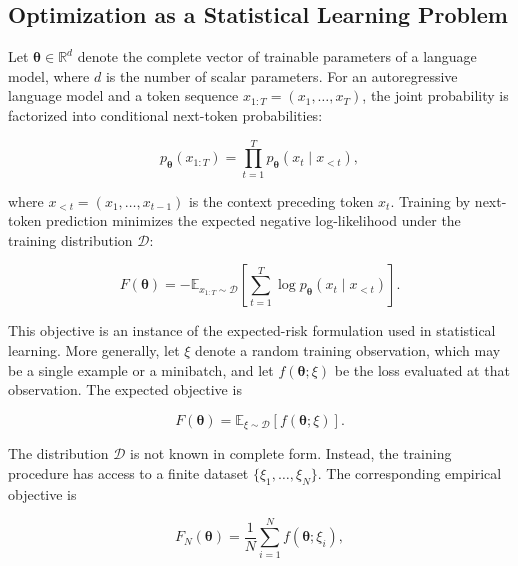 \subsection{Optimization as a Statistical Learning Problem}
\label{subsec:optimization-statistical-learning}

Let $\boldsymbol{\theta}\in\mathbb{R}^{d}$ denote the complete vector of
trainable parameters of a language model, where $d$ is the number of scalar
parameters. For an autoregressive language model and a token sequence
$x_{1:T}=(x_1,\ldots,x_T)$, the joint probability is factorized into
conditional next-token probabilities:

\begin{equation}
    p_{\boldsymbol{\theta}}(x_{1:T})
    =
    \prod_{t=1}^{T}
    p_{\boldsymbol{\theta}}(x_t\mid x_{<t}),
    \label{eq:opt-autoregressive-factorization}
\end{equation}

where $x_{<t}=(x_1,\ldots,x_{t-1})$ is the context preceding token $x_t$.
Training by next-token prediction minimizes the expected negative
log-likelihood under the training distribution $\mathcal{D}$:

\begin{equation}
    F(\boldsymbol{\theta})
    =
    -\mathbb{E}_{x_{1:T}\sim\mathcal{D}}
    \left[
        \sum_{t=1}^{T}
        \log p_{\boldsymbol{\theta}}(x_t\mid x_{<t})
    \right].
    \label{eq:opt-expected-nll}
\end{equation}

This objective is an instance of the expected-risk formulation used in
statistical learning. More generally, let $\xi$ denote a random training
observation, which may be a single example or a minibatch, and let
$f(\boldsymbol{\theta};\xi)$ be the loss evaluated at that observation. The
expected objective is

\begin{equation}
    F(\boldsymbol{\theta})
    =
    \mathbb{E}_{\xi\sim\mathcal{D}}
    \left[
        f(\boldsymbol{\theta};\xi)
    \right].
    \label{eq:opt-expected-risk}
\end{equation}

The distribution $\mathcal{D}$ is not known in complete form. Instead, the
training procedure has access to a finite dataset
$\{\xi_1,\ldots,\xi_N\}$. The corresponding empirical objective is

\begin{equation}
    F_N(\boldsymbol{\theta})
    =
    \frac{1}{N}
    \sum_{i=1}^{N}
    f(\boldsymbol{\theta};\xi_i),
    \label{eq:opt-empirical-risk}
\end{equation}

